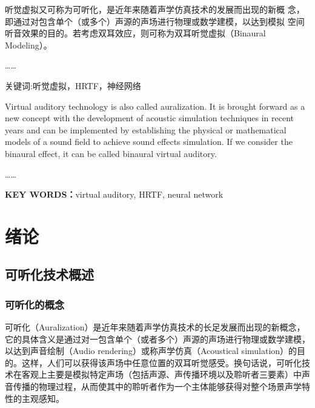 \documentclass{nwputhesis}
\begin{document}
\maketitle

\newpage
\makeabstract

听觉虚拟又可称为可听化，是近年来随着声学仿真技术的发展而出现的新概
念，即通过对包含单个（或多个）声源的声场进行物理或数学建模，以达到模拟
空间听音效果的目的。若考虑双耳效应，则可称为双耳听觉虚拟（Binaural 
Modeling）。

……

 { \blackti 关键词:}听觉虚拟，HRTF，神经网络 

\makeEnabstract

Virtual auditory technology is also called auralization. It is brought forward as a new concept with the development of acoustic simulation techniques in recent years and can be implemented by establishing the physical or mathematical models of a sound field to achieve sound effects simulation. If we consider the binaural effect, it can be called binaural virtual auditory.

……

 \textbf{ KEY WORDS：}virtual auditory, HRTF, neural network

\makecontent

\maketext

\section{绪论}
\subsection{可听化技术概述}
\subsubsection{可听化的概念}

可听化（Auralization）是近年来随着声学仿真技术的长足发展而出现的新概念，它的具体含义是通过对一包含单个（或者多个）声源的声场进行物理或数学建模，以达到声音绘制（Audio rendering）或称声学仿真（Acoustical simulation）的目的。这样，人们可以获得该声场中任意位置的双耳听觉感受。换句话说，可听化技术在客观上主要是模拟特定声场（包括声源、声传播环境以及聆听者三要素）中声音传播的物理过程，从而使其中的聆听者作为一个主体能够获得对整个场景声学特性的主观感知。
\end{document}
